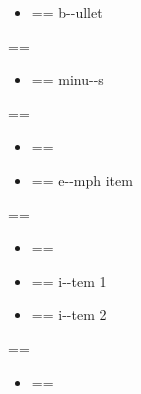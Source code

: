 \documentclass{book}
\makeatletter
\newenvironment{Texinfopreformatted}{%
  \par\GNUTobeylines\obeyspaces\frenchspacing\parskip=\z@\parindent=\z@}{}
{\catcode`\^^M=13 \gdef\GNUTobeylines{\catcode`\^^M=13 \def^^M{\null\par}}}
\newenvironment{Texinfoindented}{\begin{list}{}{}\item\relax}{\end{list}}
\renewcommand{\_}{\Texinfounderscore\discretionary{}{}{}}
\makeatother
\begin{document}
\begin{Texinfoindented}
\begin{itemize}[label=\textbullet{}]
\item \begin{Texinfopreformatted}%
\ttfamily b{-}{-}ullet
\end{Texinfopreformatted}
\end{itemize}
\begin{Texinfopreformatted}%
\ttfamily 
\end{Texinfopreformatted}
\begin{itemize}[label=-]
\item \begin{Texinfopreformatted}%
\ttfamily minu{-}{-}s
\end{Texinfopreformatted}
\end{itemize}
\begin{Texinfopreformatted}%
\ttfamily 
\end{Texinfopreformatted}
\begin{itemize}[label=\emph{after emph}]
\item \begin{Texinfopreformatted}%
\ttfamily \end{Texinfopreformatted}
\item \begin{Texinfopreformatted}%
\ttfamily e{-}{-}mph item
\end{Texinfopreformatted}
\end{itemize}
\begin{Texinfopreformatted}%
\ttfamily 
\end{Texinfopreformatted}
\begin{itemize}[label=\textbullet{} a--n itemize line]
\item \begin{Texinfopreformatted}%
\ttfamily \end{Texinfopreformatted}
\item \begin{Texinfopreformatted}%
\ttfamily {}%
i{-}{-}tem 1
\end{Texinfopreformatted}
\item \begin{Texinfopreformatted}%
\ttfamily i{-}{-}tem 2
\end{Texinfopreformatted}
\end{itemize}
\begin{Texinfopreformatted}%
\ttfamily 
\end{Texinfopreformatted}
\begin{itemize}[label={}]
\item \begin{Texinfopreformatted}%

\end{Texinfopreformatted}
\end{itemize}
\end{Texinfoindented}
\end{document}
